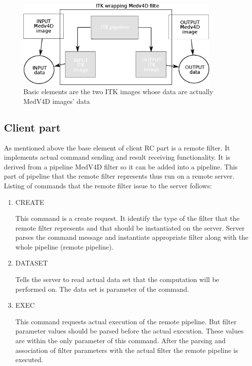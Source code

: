 \begin{figure}
    \centering
    \includegraphics[width=0.9\textwidth]{data/ITKFilter}
    \caption[ITK wrapper MedV4D filter]{Basic elements are the two ITK images whose data are actually MedV4D images' data}
    \label{fg:ITKWrapping}
\end{figure}

\subsection{Client part}

As mentioned above the base element of client RC part is a remote filter.
It implements actual command sending and result receiving functionality.
It is derived from a pipeline MedV4D filter so it can be added into a pipeline.
This part of pipeline that the remote filter represents thus run on a remote server.
Listing of commands that the remote filter issue to the server follows:
\begin{enumerate}
  \item{CREATE}
  \par
  This command is a create request.
It identify the type of the filter that the remote filter represents and that should be instantiated on the server.
Server parses the command message and instantiate appropriate filter along with the whole pipeline (remote pipeline).

  \item{DATASET}
  \par
  Tells the server to read actual data set that the computation will be performed on.
The data set is parameter of the command.

  \item{EXEC}
\par
  This command requests actual execution of the remote pipeline.
But filter parameter values should be parsed before the actual execution.
These values are within the only parameter of this command.
After the parsing and association of filter parameters with the actual filter the remote pipeline is executed.
\end{enumerate}

